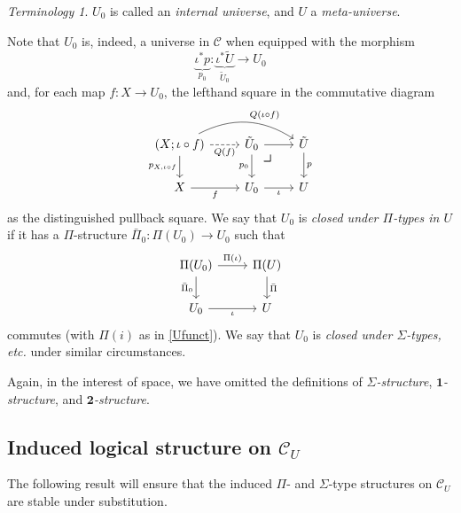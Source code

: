 \documentclass[10pt,letterpaper,cm]{nupset}
\theoremstyle{definition}
\theoremstyle{theorem}
\theoremstyle{remark}
\newtheorem*{term}{Terminology}
\newcommand{\0}{\mathbf{0}}
\newcommand{\1}{\mathbf{1}}
\newcommand{\2}{\mathbf{2}}
\renewcommand{\c}{\mathscr{C}}
\begin{document}
\begin{term}
$U_0$ is called an \textit{internal universe}, and $U$ a \textit{meta-universe}.
\end{term}

\medskip

Note that $U_0$ is, indeed, a universe in $\c$ when equipped with the morphism $$\underbrace{\iota^{\ast}{p}}_{p_0} :  \underbrace{\iota^{\ast}{\tilde{U}}}_{\tilde{U}_0} \to U_0 $$ and, for each map $f: X \to U_0$, the lefthand square in the commutative diagram
\[
\begin{tikzcd}
\mleft(X; \iota \circ f\mright) \arrow[d, "{p_{X, \iota \circ f}}"'] \arrow[r, "Q(f)"', dashed] \arrow[rr, "Q(\iota \circ f)", bend left] & \tilde{U}_0 \arrow[d, "p_0"'] \arrow[r]  \arrow[dr, phantom, "\scalebox{1.5}{\color{black}$\lrcorner$}", very near start] & \tilde{U} \arrow[d, "p"] \\
X \arrow[r, "f"']                                                                                                                       & U_0 \arrow[r, "\iota"']                & U                       
\end{tikzcd}
\] as the distinguished pullback square. We say that $U_0$ is \textit{closed under $\Pi$-types in $U$} if it has a $\Pi$-structure $\bar{\Pi}_0 : \Pi(U_0) \to U_0$ such that 
\[
\begin{tikzcd}
\Pi(U_0) \arrow[d, "\bar{\Pi}_0"'] \arrow[r, "\Pi(\iota)"] & \Pi(U) \arrow[d, "\bar{\Pi}"] \\
U_0 \arrow[r, "\iota"']                                 & U                         
\end{tikzcd}
\]
 commutes (with $\Pi(i)$ as in \cref{Ufunct}). We say that $U_0$ is \textit{closed under $\Sigma$-types, etc.} under similar circumstances.

\bigskip

Again, in the interest of space, we have omitted the definitions of \textit{$\Sigma$-structure}, \textit{$\1$-structure}, and \textit{$\2$-structure}.

\subsection*{Induced logical structure on $\c_U$}

The following result will ensure that the induced $\Pi$- and $\Sigma$-type structures on $\c_U$ are stable under substitution.
\end{document}
